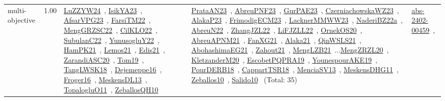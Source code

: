 {\begin{longtable}{p{3cm}r>{\raggedright\arraybackslash}p{6cm}>{\raggedright\arraybackslash}p{6cm}>{\raggedright\arraybackslash}p{8cm}}
\index{multi-objective}\index{Concepts!multi-objective}multi-objective &  1.00 & \href{../works/LuZZYW24.pdf}{LuZZYW24}~\cite{LuZZYW24}, \href{../works/IsikYA23.pdf}{IsikYA23}~\cite{IsikYA23}, \href{../works/AfsarVPG23.pdf}{AfsarVPG23}~\cite{AfsarVPG23}, \href{../works/FarsiTM22.pdf}{FarsiTM22}~\cite{FarsiTM22}, \href{../works/MengGRZSC22.pdf}{MengGRZSC22}~\cite{MengGRZSC22}, \href{../works/CilKLO22.pdf}{CilKLO22}~\cite{CilKLO22}, \href{../works/SubulanC22.pdf}{SubulanC22}~\cite{SubulanC22}, \href{../works/YunusogluY22.pdf}{YunusogluY22}~\cite{YunusogluY22}, \href{../works/HamPK21.pdf}{HamPK21}~\cite{HamPK21}, \href{../works/Lemos21.pdf}{Lemos21}~\cite{Lemos21}, \href{../works/Edis21.pdf}{Edis21}~\cite{Edis21}, \href{../works/ZarandiASC20.pdf}{ZarandiASC20}~\cite{ZarandiASC20}, \href{../works/Tom19.pdf}{Tom19}~\cite{Tom19}, \href{../works/TangLWSK18.pdf}{TangLWSK18}~\cite{TangLWSK18}, \href{../works/Dejemeppe16.pdf}{Dejemeppe16}~\cite{Dejemeppe16}, \href{../works/Froger16.pdf}{Froger16}~\cite{Froger16}, \href{../works/MeskensDL13.pdf}{MeskensDL13}~\cite{MeskensDL13}, \href{../works/TopalogluO11.pdf}{TopalogluO11}~\cite{TopalogluO11}, \href{../works/ZeballosQH10.pdf}{ZeballosQH10}~\cite{ZeballosQH10} & \href{../works/PrataAN23.pdf}{PrataAN23}~\cite{PrataAN23}, \href{../works/AbreuPNF23.pdf}{AbreuPNF23}~\cite{AbreuPNF23}, \href{../works/GurPAE23.pdf}{GurPAE23}~\cite{GurPAE23}, \href{../works/CzerniachowskaWZ23.pdf}{CzerniachowskaWZ23}~\cite{CzerniachowskaWZ23}, \href{../works/AlakaP23.pdf}{AlakaP23}~\cite{AlakaP23}, \href{../works/FrimodigECM23.pdf}{FrimodigECM23}~\cite{FrimodigECM23}, \href{../works/LacknerMMWW23.pdf}{LacknerMMWW23}~\cite{LacknerMMWW23}, \href{../works/NaderiBZ22a.pdf}{NaderiBZ22a}~\cite{NaderiBZ22a}, \href{../works/AbreuN22.pdf}{AbreuN22}~\cite{AbreuN22}, \href{../works/ZhangJZL22.pdf}{ZhangJZL22}~\cite{ZhangJZL22}, \href{../works/LiFJZLL22.pdf}{LiFJZLL22}~\cite{LiFJZLL22}, \href{../works/OrnekOS20.pdf}{OrnekOS20}~\cite{OrnekOS20}, \href{../works/AbreuAPNM21.pdf}{AbreuAPNM21}~\cite{AbreuAPNM21}, \href{../works/FanXG21.pdf}{FanXG21}~\cite{FanXG21}, \href{../works/Alaka21.pdf}{Alaka21}~\cite{Alaka21}, \href{../works/QinWSLS21.pdf}{QinWSLS21}~\cite{QinWSLS21}, \href{../works/AbohashimaEG21.pdf}{AbohashimaEG21}~\cite{AbohashimaEG21}, \href{../works/Zahout21.pdf}{Zahout21}~\cite{Zahout21}, \href{../works/MengLZB21.pdf}{MengLZB21}~\cite{MengLZB21}...\href{../works/MengZRZL20.pdf}{MengZRZL20}~\cite{MengZRZL20}, \href{../works/KletzanderM20.pdf}{KletzanderM20}~\cite{KletzanderM20}, \href{../works/EscobetPQPRA19.pdf}{EscobetPQPRA19}~\cite{EscobetPQPRA19}, \href{../works/YounespourAKE19.pdf}{YounespourAKE19}~\cite{YounespourAKE19}, \href{../works/PourDERB18.pdf}{PourDERB18}~\cite{PourDERB18}, \href{../works/CappartTSR18.pdf}{CappartTSR18}~\cite{CappartTSR18}, \href{../works/MenciaSV13.pdf}{MenciaSV13}~\cite{MenciaSV13}, \href{../works/MeskensDHG11.pdf}{MeskensDHG11}~\cite{MeskensDHG11}, \href{../works/Zeballos10.pdf}{Zeballos10}~\cite{Zeballos10}, \href{../works/Salido10.pdf}{Salido10}~\cite{Salido10} (Total: 35) & \href{../works/abs-2402-00459.pdf}{abs-2402-00459}~\cite{abs-2402-00459}, 
\end{longtable}}
